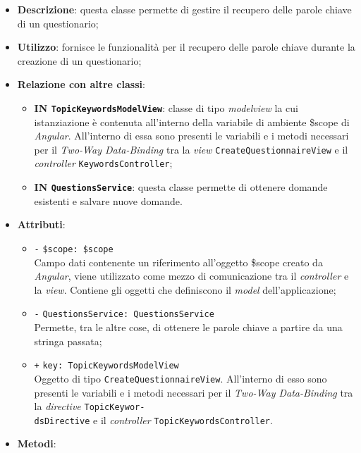 \begin{itemize}
	\item \textbf{Descrizione}: questa classe permette di gestire il recupero delle parole chiave di un questionario;
	\item \textbf{Utilizzo}: fornisce le funzionalità per il recupero delle parole chiave durante la creazione di un questionario;
	\item \textbf{Relazione con altre classi}:
	\begin{itemize}
		\item \textbf{IN \texttt{TopicKeywordsModelView}}: classe di tipo \textit{modelview} la cui istanziazione è contenuta all'interno della variabile di ambiente \$scope di \textit{Angular}. All'interno di essa sono presenti le variabili e i metodi necessari per il \textit{Two-Way Data-Binding} tra la \textit{view} \texttt{CreateQuestionnaireView} e il \textit{controller} \texttt{KeywordsController}; 
		\item \textbf{IN \texttt{QuestionsService}}: questa classe permette di ottenere domande esistenti e salvare nuove domande.
	\end{itemize}
	\item \textbf{Attributi}:
	\begin{itemize}
		\item \texttt{-} \texttt{\$scope: \$scope} \\
		Campo dati contenente un riferimento all'oggetto \$scope creato da \textit{Angular}, viene utilizzato come mezzo di comunicazione tra il \textit{controller} e la \textit{view}. Contiene gli oggetti che definiscono il \textit{model} dell'applicazione;
		\item \texttt{-} \texttt{QuestionsService: QuestionsService}\\ 
		Permette, tra le altre cose, di ottenere le parole chiave a partire da una stringa passata;
		\item \texttt{+} \texttt{key: TopicKeywordsModelView} \\
		Oggetto di tipo \texttt{CreateQuestionnaireView}. All'interno di esso sono presenti le variabili e i metodi necessari per il \textit{Two-Way Data-Binding} tra la \textit{directive} \texttt{TopicKeywor-\\dsDirective} e il \textit{controller} \texttt{TopicKeywordsController}.
	\end{itemize}
	\item \textbf{Metodi}:
	\begin{itemize}

\end{itemize}
\end{itemize}
